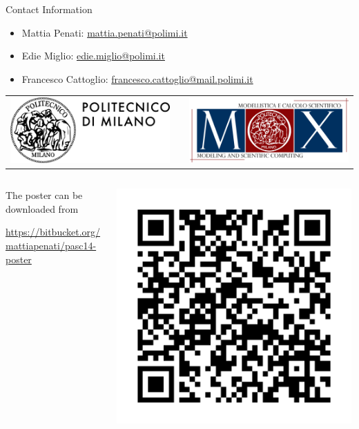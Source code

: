 \documentclass[final]{beamer}
\newlength{\onecolwid}
\begin{document}
\begin{frame}[t]
\begin{columns}[t]
\begin{column}{\onecolwid}
\begin{alertblock}{Contact Information}
\begin{itemize}
    \item Mattia Penati: \href{mailto:mattia.penati@polimi.it}{mattia.penati@polimi.it}
    \item Edie Miglio: \href{mailto:edie.miglio@polimi.it}{edie.miglio@polimi.it}
    \item Francesco Cattoglio: \href{mailto:francesco.cattoglio@mail.polimi.it}{francesco.cattoglio@mail.polimi.it}
\end{itemize}
\begin{center}
    \begin{tabular}{ccc}
        \includegraphics[width=0.4\linewidth]{images/logopoli} %
        & \hfill & %
        \includegraphics[width=0.4\linewidth]{images/logomox}
    \end{tabular}
\end{center}
\hrulefill
\begin{columns}[onlytextwidth]
\begin{column}{0.83\textwidth}
    The poster can be downloaded from
    \begin{center}
        \footnotesize
        \url{https://bitbucket.org/mattiapenati/pasc14-poster}
    \end{center}
\end{column}
\begin{column}{0.17\textwidth}
    \includegraphics[width=0.99\textwidth]{images/qr}

\end{column}
\end{columns}
\end{alertblock}
\end{column}
\end{columns}
\end{frame}
\end{document}
